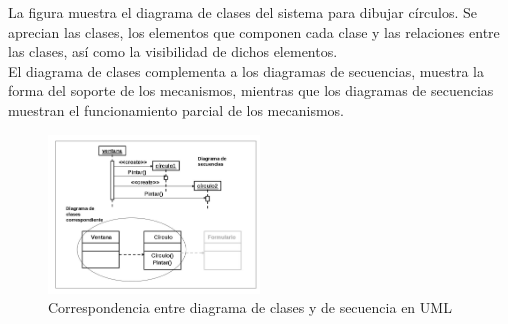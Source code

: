 La figura muestra el diagrama de clases del sistema para dibujar
círculos. Se aprecian las clases, los elementos que componen cada
clase y las relaciones entre las clases, así como la visibilidad de
dichos elementos.\\
El diagrama de clases complementa a los diagramas de secuencias,
muestra la forma del soporte de los mecanismos, mientras que los
diagramas de secuencias muestran el funcionamiento parcial de los
mecanismos.
\begin{figure}[ht!]  \centering
  \includegraphics[width=0.5\textwidth]{images/fig34}
  \caption{Correspondencia entre diagrama de clases y de secuencia en UML}
  \label{fig:34}
\end{figure}